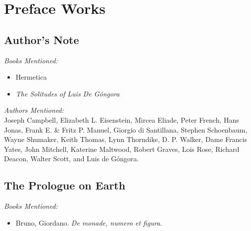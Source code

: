 \documentclass[12pt,makeidx]{extreport}
\begin{document}
\chapter{Preface Works}
\section{Author's Note}

\textit{Books Mentioned:}
\begin{itemize}%
\item Hermetica \cite{Scott1924}
\item \textit{The Solitudes of Luis De Góngora} \cite{DeGongoraYArgote1968}
\end{itemize}

\textit{Authors Mentioned:}\\
Joseph Campbell, Elizabeth L. Eisenstein, Mircea Eliade, Peter French, Hans Jonas, Frank
E. \& Fritz P. Manuel, Giorgio di Santillana, Stephen Schoenbaum, Wayne Shumaker, Keith
Thomas, Lynn Thorndike, D. P. Walker, Dame Francis Yates, John Mitchell, Katerine
Maltwood, Robert Graves, Lois Rose, Richard Deacon, Walter Scott, and Luis de Góngora.

\section{The Prologue on Earth}
\pagestyle{fancy}
\textit{Books Mentioned:}
\begin{itemize}
\item Bruno, Giordano. \textit{De monade, numero et figura}. \cite{Bruno1961}
\end{itemize}

\begin{center}
\end{center}
\end{document}
